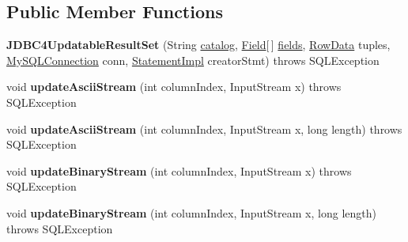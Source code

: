 \subsection*{Public Member Functions}
\begin{DoxyCompactItemize}
\item 
\mbox{\label{classcom_1_1mysql_1_1jdbc_1_1_j_d_b_c4_updatable_result_set_a2b04a1e58508b00bf5e3190e2ad16676}} 
{\bfseries J\+D\+B\+C4\+Updatable\+Result\+Set} (String \mbox{\hyperlink{classcom_1_1mysql_1_1jdbc_1_1_result_set_impl_ae05d8a0ad69c96645b783537100fb95c}{catalog}}, \mbox{\hyperlink{classcom_1_1mysql_1_1jdbc_1_1_field}{Field}}\mbox{[}$\,$\mbox{]} \mbox{\hyperlink{classcom_1_1mysql_1_1jdbc_1_1_result_set_impl_a5da5c6ef8d035aa65884115a2f7daf67}{fields}}, \mbox{\hyperlink{interfacecom_1_1mysql_1_1jdbc_1_1_row_data}{Row\+Data}} tuples, \mbox{\hyperlink{interfacecom_1_1mysql_1_1jdbc_1_1_my_s_q_l_connection}{My\+S\+Q\+L\+Connection}} conn, \mbox{\hyperlink{classcom_1_1mysql_1_1jdbc_1_1_statement_impl}{Statement\+Impl}} creator\+Stmt)  throws S\+Q\+L\+Exception 
\item 
\mbox{\label{classcom_1_1mysql_1_1jdbc_1_1_j_d_b_c4_updatable_result_set_a2e44a20dabd28d978f6102d075bd7506}} 
void {\bfseries update\+Ascii\+Stream} (int column\+Index, Input\+Stream x)  throws S\+Q\+L\+Exception 
\item 
\mbox{\label{classcom_1_1mysql_1_1jdbc_1_1_j_d_b_c4_updatable_result_set_a5c55dd2f4aee77d2f21cdc9ee7492787}} 
void {\bfseries update\+Ascii\+Stream} (int column\+Index, Input\+Stream x, long length)  throws S\+Q\+L\+Exception 
\item 
\mbox{\label{classcom_1_1mysql_1_1jdbc_1_1_j_d_b_c4_updatable_result_set_af9cbd22867679f943356d2d5d37088f5}} 
void {\bfseries update\+Binary\+Stream} (int column\+Index, Input\+Stream x)  throws S\+Q\+L\+Exception 
\item 
\mbox{\label{classcom_1_1mysql_1_1jdbc_1_1_j_d_b_c4_updatable_result_set_a45df6dd34ee8235d89110f58a3103e6f}} 
void {\bfseries update\+Binary\+Stream} (int column\+Index, Input\+Stream x, long length)  throws S\+Q\+L\+Exception 

\end{DoxyCompactItemize}

